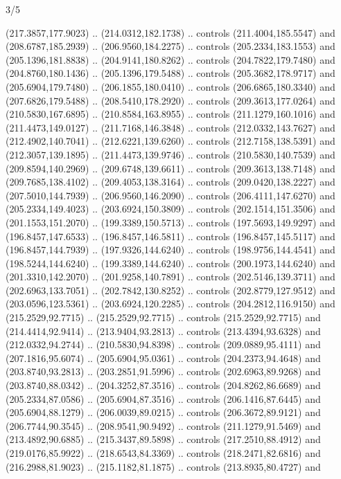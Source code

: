 \begin{flagdescription}{3/5}
\begin{scope}[xshift=0.5\flaglength,yshift=0.5\flagwidth,scale=\flagwidth/270]
\begin{scope}[y=0.8pt, x=0.8pt, yscale=-1,shift={(-281.25,-168.75)}]
  (217.3857,177.9023) .. (214.0312,182.1738) .. controls (211.4004,185.5547) and
  (208.6787,185.2939) .. (206.9560,184.2275) .. controls (205.2334,183.1553) and
  (205.1396,181.8838) .. (204.9141,180.8262) .. controls (204.7822,179.7480) and
  (204.8760,180.1436) .. (205.1396,179.5488) .. controls (205.3682,178.9717) and
  (205.6904,179.7480) .. (206.1855,180.0410) .. controls (206.6865,180.3340) and
  (207.6826,179.5488) .. (208.5410,178.2920) .. controls (209.3613,177.0264) and
  (210.5830,167.6895) .. (210.8584,163.8955) .. controls (211.1279,160.1016) and
  (211.4473,149.0127) .. (211.7168,146.3848) .. controls (212.0332,143.7627) and
  (212.4902,140.7041) .. (212.6221,139.6260) .. controls (212.7158,138.5391) and
  (212.3057,139.1895) .. (211.4473,139.9746) .. controls (210.5830,140.7539) and
  (209.8594,140.2969) .. (209.6748,139.6611) .. controls (209.3613,138.7148) and
  (209.7685,138.4102) .. (209.4053,138.3164) .. controls (209.0420,138.2227) and
  (207.5010,144.7939) .. (206.9560,146.2090) .. controls (206.4111,147.6270) and
  (205.2334,149.4023) .. (203.6924,150.3809) .. controls (202.1514,151.3506) and
  (201.1553,151.2070) .. (199.3389,150.5713) .. controls (197.5693,149.9297) and
  (196.8457,147.6533) .. (196.8457,146.5811) .. controls (196.8457,145.5117) and
  (196.8457,144.7939) .. (197.9326,144.6240) .. controls (198.9756,144.4541) and
  (198.5244,144.6240) .. (199.3389,144.6240) .. controls (200.1973,144.6240) and
  (201.3310,142.2070) .. (201.9258,140.7891) .. controls (202.5146,139.3711) and
  (202.6963,133.7051) .. (202.7842,130.8252) .. controls (202.8779,127.9512) and
  (203.0596,123.5361) .. (203.6924,120.2285) .. controls (204.2812,116.9150) and
  (215.2529,92.7715) .. (215.2529,92.7715) .. controls (215.2529,92.7715) and
  (214.4414,92.9414) .. (213.9404,93.2813) .. controls (213.4394,93.6328) and
  (212.0332,94.2744) .. (210.5830,94.8398) .. controls (209.0889,95.4111) and
  (207.1816,95.6074) .. (205.6904,95.0361) .. controls (204.2373,94.4648) and
  (203.8740,93.2813) .. (203.2851,91.5996) .. controls (202.6963,89.9268) and
  (203.8740,88.0342) .. (204.3252,87.3516) .. controls (204.8262,86.6689) and
  (205.2334,87.0586) .. (205.6904,87.3516) .. controls (206.1416,87.6445) and
  (205.6904,88.1279) .. (206.0039,89.0215) .. controls (206.3672,89.9121) and
  (206.7744,90.3545) .. (208.9541,90.9492) .. controls (211.1279,91.5469) and
  (213.4892,90.6885) .. (215.3437,89.5898) .. controls (217.2510,88.4912) and
  (219.0176,85.9922) .. (218.6543,84.3369) .. controls (218.2471,82.6816) and
  (216.2988,81.9023) .. (215.1182,81.1875) .. controls (213.8935,80.4727) and

\end{scope}
\end{scope}
\end{flagdescription}
